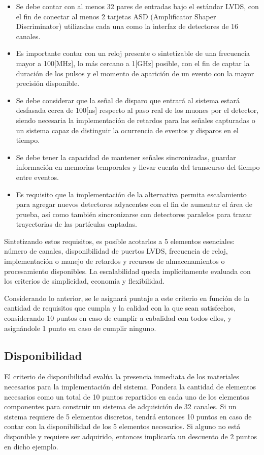\begin{itemize}
	\item Se debe contar con al menos 32 pares de entradas bajo el estándar LVDS, con el fin de conectar al menos 2 tarjetas ASD (Amplificator Shaper Discriminator) utilizadas cada una como la interfaz de detectores de 16 canales.
	\item Es importante contar con un reloj presente o sintetizable de una frecuencia mayor a 100[MHz], lo más cercano a 1[GHz] posible, con el fin de captar la duración de los pulsos y el momento de aparición de un evento con la mayor precisión disponible.
	\item Se debe considerar que la señal de disparo que entrará al sistema estará desfasada cerca de 100[ns] respecto al paso real de los muones por el detector, siendo necesaria la implementación de retardos para las señales capturadas o un sistema capaz de distinguir la ocurrencia de eventos y disparos en el tiempo.
	\item  Se debe tener la capacidad de mantener señales sincronizadas, guardar información en memorias temporales y llevar cuenta del transcurso del tiempo entre eventos.
	\item Es requisito que la implementación de la alternativa permita escalamiento para agregar nuevos detectores adyacentes con el fin de aumentar el área de prueba, así como también sincronizarse con detectores paralelos para trazar trayectorias de las partículas captadas.
\end{itemize}

\par Sintetizando estos requisitos, es posible acotarlos a  5 elementos esenciales: número de canales, disponibilidad de puertos LVDS, frecuencia de reloj, implementación o manejo de retardos y recursos de almacenamientos o procesamiento disponibles. La escalabilidad queda implícitamente evaluada con los criterios de simplicidad, economía y flexibilidad.

\par Considerando lo anterior, se le asignará puntaje a este criterio en función de la cantidad de requisitos que cumpla y la calidad con la que sean satisfechos, considerando 10 puntos en caso de cumplir a cabalidad con todos ellos, y asignándole 1 punto en caso de cumplir ninguno.

\subsection*{Disponibilidad}
\par El criterio de disponibilidad evalúa la presencia inmediata de los materiales necesarios para la implementación del sistema. Pondera la cantidad de elementos necesarios como un total de 10 puntos repartidos en cada uno de los elementos componentes para construir un sistema de adquisición de 32 canales. Si un sistema requiere de 5 elementos discretos, tendrá entonces 10 puntos en caso de contar con la disponibilidad de los 5 elementos necesarios. Si alguno no está disponible y requiere ser adquirido, entonces implicaría un descuento de 2 puntos en dicho ejemplo.

